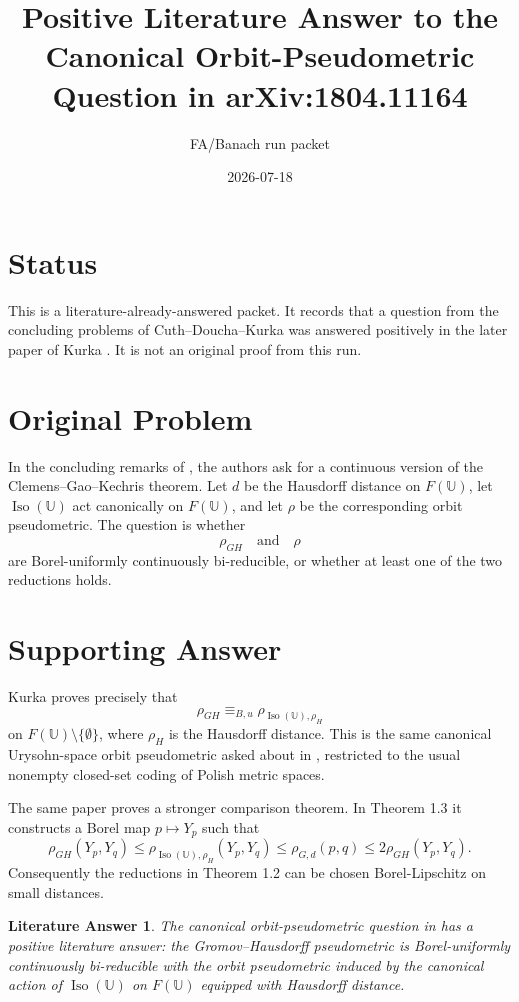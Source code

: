 \documentclass[11pt]{article}
\title{Positive Literature Answer to the Canonical Orbit-Pseudometric Question in arXiv:1804.11164}
\author{FA/Banach run packet}
\date{2026-07-18}
\newtheorem*{theorem}{Literature Answer}
\begin{document}
\maketitle

\section*{Status}

This is a literature-already-answered packet. It records that a question from
the concluding problems of Cuth--Doucha--Kurka \cite{CDK1} was answered
positively in the later paper of Kurka \cite{Kurka}. It is not an original proof
from this run.

\section*{Original Problem}

In the concluding remarks of \cite{CDK1}, the authors ask for a continuous
version of the Clemens--Gao--Kechris theorem. Let \(d\) be the Hausdorff
distance on \(F(\mathbb U)\), let \(\operatorname{Iso}(\mathbb U)\) act
canonically on \(F(\mathbb U)\), and let \(\rho\) be the corresponding orbit
pseudometric. The question is whether
\[
  \rho_{GH}
  \quad\text{and}\quad
  \rho
\]
are Borel-uniformly continuously bi-reducible, or whether at least one of the
two reductions holds.

\section*{Supporting Answer}

Kurka \cite[Theorem 1.2]{Kurka} proves precisely that
\[
  \rho_{GH}
  \equiv_{B,u}
  \rho_{\operatorname{Iso}(\mathbb U),\rho_H}
\]
on \(F(\mathbb U)\setminus\{\emptyset\}\), where \(\rho_H\) is the Hausdorff
distance. This is the same canonical Urysohn-space orbit pseudometric asked
about in \cite{CDK1}, restricted to the usual nonempty closed-set coding of
Polish metric spaces.

The same paper proves a stronger comparison theorem. In Theorem 1.3 it
constructs a Borel map \(p\mapsto Y_p\) such that
\[
  \rho_{GH}(Y_p,Y_q)
  \leq \rho_{\operatorname{Iso}(\mathbb U),\rho_H}(Y_p,Y_q)
  \leq \rho_{G,d}(p,q)
  \leq 2\rho_{GH}(Y_p,Y_q).
\]
Consequently the reductions in Theorem 1.2 can be chosen Borel-Lipschitz on
small distances.

\begin{theorem}
The canonical orbit-pseudometric question in \cite{CDK1} has a positive
literature answer: the Gromov--Hausdorff pseudometric is Borel-uniformly
continuously bi-reducible with the orbit pseudometric induced by the canonical
action of \(\operatorname{Iso}(\mathbb U)\) on \(F(\mathbb U)\) equipped with
Hausdorff distance.
\end{theorem}
\end{document}
